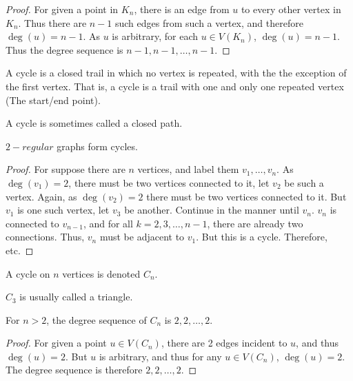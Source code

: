 \documentclass[crop=false,class=book,oneside]{standalone}
\begin{document}
        \begin{proof}
        For given a point in $K_n$, there is an edge from $u$ to every other vertex in $K_n$. Thus there are $n-1$ such edges from such 
        a vertex, and therefore $\deg(u) = n-1$. As $u$ is arbitrary, for each $u\in V(K_n)$, $\deg(u) = n-1$. Thus the degree sequence is $n-1,n-1,\hdots, n-1$.
        \end{proof}
        \begin{definition}
        A cycle is a closed trail in which no vertex is repeated, with the the exception of the first vertex. That is, a cycle is a trail with one and only one repeated vertex (The start/end point).
        \end{definition}
        \begin{remark}
        A cycle is sometimes called a closed path.
        \end{remark}
        \begin{corollary}
        $2-regular$ graphs form cycles.
        \end{corollary}
        \begin{proof}
        For suppose there are $n$ vertices, and label them $v_1,\hdots, v_n$. As $\deg(v_1)=2$, there must be two vertices connected to it, let $v_2$ be such a vertex. Again, as $\deg(v_2)=2$ there must be two vertices connected to it. But $v_1$ is one such vertex, let $v_3$ be another. Continue in the manner until $v_n$. $v_n$ is connected to $v_{n-1}$, and for all $k=2,3,\hdots, n-1$, there are already two connections. Thus, $v_n$ must be adjacent to $v_1$. But this is a cycle. Therefore, etc.
        \end{proof}
        \begin{definition}
        A cycle on $n$ vertices is denoted $C_n$.
        \end{definition}
        \begin{remark}
        $C_3$ is usually called a triangle.
        \end{remark}
        \begin{corollary}
        For $n>2$, the degree sequence of $C_n$ is $2,2,\hdots, 2$.
        \end{corollary}
        \begin{proof}
        For given a point $u\in V(C_n)$, there are 2 edges incident to $u$, and thus $\deg(u) = 2$. But $u$ is arbitrary, and thus for any $u\in V(C_n)$, $\deg(u) = 2$. The degree sequence is therefore $2,2,\hdots, 2$.
        \end{proof}
\end{document}
